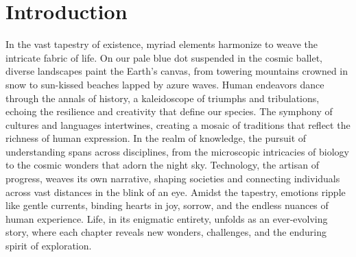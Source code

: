 \section{Introduction}
In the vast tapestry of existence, myriad elements harmonize to weave the intricate fabric of life. On our pale blue dot suspended in the cosmic ballet, diverse landscapes paint the Earth's canvas, from towering mountains crowned in snow to sun-kissed beaches lapped by azure waves. Human endeavors dance through the annals of history, a kaleidoscope of triumphs and tribulations, echoing the resilience and creativity that define our species. The symphony of cultures and languages intertwines, creating a mosaic of traditions that reflect the richness of human expression. In the realm of knowledge, the pursuit of understanding spans across disciplines, from the microscopic intricacies of biology to the cosmic wonders that adorn the night sky. Technology, the artisan of progress, weaves its own narrative, shaping societies and connecting individuals across vast distances in the blink of an eye. Amidst the tapestry, emotions ripple like gentle currents, binding hearts in joy, sorrow, and the endless nuances of human experience. Life, in its enigmatic entirety, unfolds as an ever-evolving story, where each chapter reveals new wonders, challenges, and the enduring spirit of exploration.

